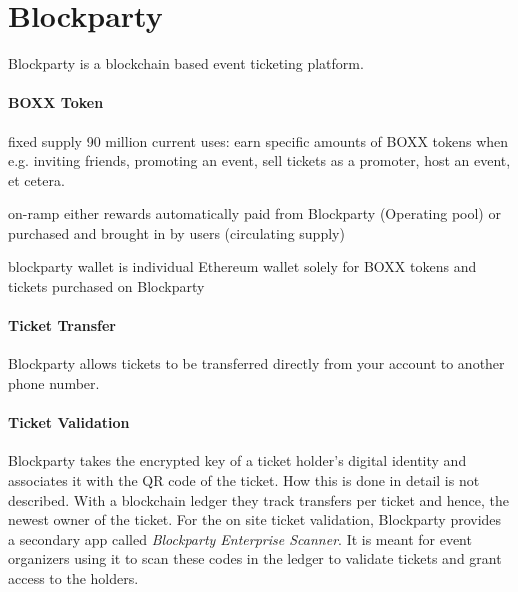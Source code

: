 
\section{Blockparty}

Blockparty \cite{blockparty-whitepaper} is a blockchain based event ticketing platform. 

\paragraph{BOXX Token} 
fixed supply 90 million
current uses: earn specific amounts of BOXX tokens when e.g. inviting friends, promoting an event, sell tickets as a promoter, host an event, et cetera.

on-ramp
either rewards automatically paid from Blockparty (Operating pool) or purchased and brought in by users (circulating supply)

blockparty wallet is individual Ethereum wallet solely for BOXX tokens and tickets purchased on Blockparty

\paragraph{Ticket Transfer} Blockparty allows tickets to be transferred directly from your account to another phone number.


\paragraph{Ticket Validation} Blockparty takes the encrypted key of a ticket holder's digital identity and associates it with the QR code of the ticket. How this is done in detail is not described. With a blockchain ledger they track transfers per ticket and hence, the newest owner of the ticket. For the on site ticket validation, Blockparty provides a secondary app called \textit{Blockparty Enterprise Scanner}. It is meant for event organizers using it to scan these codes in the ledger to validate tickets and grant access to the holders.
